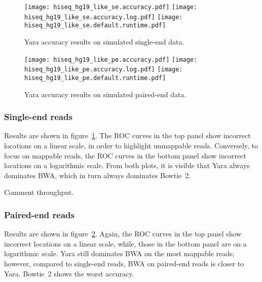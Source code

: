 \begin{figure}[t]
\begin{center}
\caption[Yara accuracy results on simulated single-end data]{Yara accuracy results on simulated single-end data.}
\label{fig:yara:accuracy-se}
\texttt{[image: hiseq\_hg19\_like\_se.accuracy.pdf]}
\texttt{[image: hiseq\_hg19\_like\_se.accuracy.log.pdf]}
\texttt{[image: hiseq\_hg19\_like\_se.default.runtime.pdf]}
\end{center}
\end{figure}


\begin{figure}[t]
\begin{center}
\caption[Yara accuracy results on simulated paired-end data]{Yara accuracy results on simulated paired-end data.}
\label{fig:yara:accuracy-pe}
\texttt{[image: hiseq\_hg19\_like\_pe.accuracy.pdf]}
\texttt{[image: hiseq\_hg19\_like\_pe.accuracy.log.pdf]}
\texttt{[image: hiseq\_hg19\_like\_pe.default.runtime.pdf]}
\end{center}
\end{figure}

\subsubsection{Single-end reads}
Results are shown in figure~\ref{fig:yara:accuracy-se}.
The ROC curves in the top panel show incorrect locations on a linear scale, in order to highlight unmappable reads.
Conversely, to focus on mappable reads, the ROC curves in the bottom panel show incorrect locations on a logarithmic scale.
From both plots, it is visible that Yara always dominates BWA, which in turn always dominates Bowtie~2.

Comment throughput.

\subsubsection{Paired-end reads}
Results are shown in figure~\ref{fig:yara:accuracy-pe}.
Again, the ROC curves in the top panel show incorrect locations on a linear scale, while, those in the bottom panel are on a logarithmic scale.
Yara still dominates BWA on the most mappable reads; however, compared to single-end reads, BWA on paired-end reads is closer to Yara.
Bowtie~2 shows the worst accuracy. 

